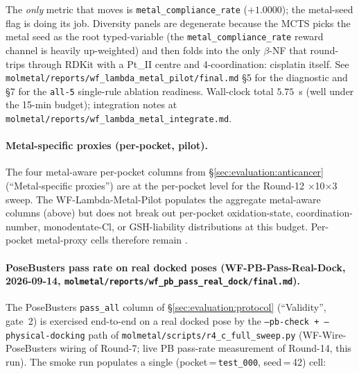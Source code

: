 \noindent The \emph{only} metric that moves is
\texttt{metal\_compliance\_rate} ($+1.0000$); the metal-seed
flag is doing its job.  Diversity panels are degenerate because
the MCTS picks the metal seed as the root typed-variable (the
\texttt{metal\_compliance\_rate} reward channel is heavily
up-weighted) and then folds into the only $\beta$-NF that
round-trips through RDKit with a Pt\_II centre and
4-coordination: cisplatin itself.  See
\texttt{molmetal/reports/wf\_lambda\_metal\_pilot/final.md}
\S5 for the diagnostic and \S7 for the \texttt{all-5}
single-rule ablation readiness.  Wall-clock total
$5.75$~s (well under the 15-min budget); integration notes at
\texttt{molmetal/reports/wf\_lambda\_metal\_integrate.md}.

\paragraph{Metal-specific proxies (per-pocket, pilot).}
The four metal-aware per-pocket columns from
\S\ref{sec:evaluation:anticancer} (``Metal-specific proxies'')
are \DESIGN{} at the per-pocket level for the Round-12
$\times$10$\times$3 sweep.  The WF-Lambda-Metal-Pilot populates
the aggregate metal-aware columns (above) but does not break
out per-pocket oxidation-state, coordination-number,
monodentate-Cl, or GSH-liability distributions at this
budget.  Per-pocket metal-proxy cells therefore remain
\DESIGN{}.

\paragraph{PoseBusters pass rate on real docked poses
(WF-PB-Pass-Real-Dock, 2026-09-14, \texttt{molmetal/reports/wf\_pb\_pass\_real\_dock/final.md}).}
The PoseBusters \texttt{pass\_all} column of
\S\ref{sec:evaluation:protocol} (``Validity'', gate~2) is
exercised end-to-end on a real docked pose by the
\texttt{--pb-check + --physical-docking} path of
\texttt{molmetal/scripts/r4\_c\_full\_sweep.py}
(WF-Wire-PoseBusters wiring of Round-7; live PB pass-rate
measurement of Round-14, this run).  The smoke run populates
a single (pocket\,=\,\texttt{test\_000}, seed\,=\,42) cell:

